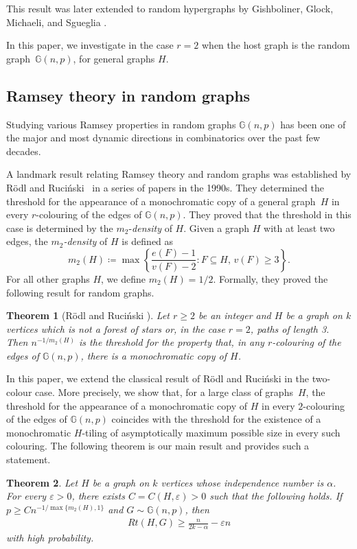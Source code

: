 \documentclass[a4paper,reqno,11pt]{amsart}
\newtheorem{theorem}{Theorem}[section]
\theoremstyle{definition}
\theoremstyle{remark}
\renewcommand\geq{\geqslant}
\renewcommand\ge{\geqslant}
\begin{document}
This result was later extended to random hypergraphs by Gishboliner, Glock, Michaeli, and Sgueglia \cite{GGMS}.

In this paper, we investigate  in the case $r=2$ when the host graph is the random graph~$\mathbb{G}(n,p)$, for general graphs $H$.

\subsection{Ramsey theory in random graphs}Studying various Ramsey properties in random graphs $\mathbb{G}(n,p)$ has been one of the major and most dynamic directions in combinatorics over the past few decades.

A landmark result relating Ramsey theory and random graphs was established by R\"{o}dl and Ruci\'{n}ski~\cite{RR93, RR94, RR95} in a series of papers in the 1990s. They determined the threshold for the appearance of a monochromatic copy of a general graph~$H$ in every \mbox{$r$-colouring} of the edges of $\mathbb{G}(n,p)$. They proved that the threshold in this case is determined by the $m_2$-\textit{density} of $H$. Given a graph $H$ with at least two edges, the \emph{$m_2$-density} of $H$ is defined as
\[m_2(H) \coloneq\max\left\{\frac{e(F)-1}{v(F)-2} \colon F \subseteq H, \, v(F) \ge 3 \right\}.\]
For all other graphs $H$, we define $m_2(H)=1/2$. Formally, they proved the following result for random graphs.

\begin{theorem}[R\"{o}dl and Ruci\'{n}ski \cite{RR93, RR94, RR95}]\label{thm:RR}
Let $r\ge2$ be an integer and $H$ be a graph on $k$ vertices which is not a forest of stars or, in the case $r=2$, paths of length 3. Then $n^{-1/m_2(H)}$ is the threshold for the property that, in any $r$-colouring of the edges of $\mathbb{G}(n,p)$, there is a monochromatic copy of $H$.
\end{theorem}

In this paper, we extend the classical result of R\"{o}dl and Ruci\'{n}ski in the two-colour case. More precisely, we show that, for a large class of graphs~$H$, the threshold for the appearance of a monochromatic copy of $H$ in every $2$-colouring of the edges of $\mathbb{G}(n,p)$ coincides with the threshold for the existence of a monochromatic $H$-tiling of asymptotically maximum possible size in every such colouring. The following theorem is our main result and provides such a statement.

\begin{theorem}\label{thm:Hlower}
Let $H$ be a graph on $k$ vertices whose independence number is $\alpha$. For every $\varepsilon>0$, there exists $C=C(H,\varepsilon)>0$ such that the following holds. If $p\geq Cn^{-1/\max\{m_2(H),1
\}}$ and $G\sim \mathbb{G}(n,p)$, then
\begin{align*}
 Rt(H,G)\geq \frac{n}{2k-\alpha}-\varepsilon n  
\end{align*}
with high probability.
\end{theorem}
\end{document}
